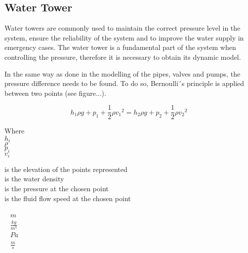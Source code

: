 \subsection{Water Tower} 
\label{WaterTankModel}

Water towers are commonly used to maintain the correct pressure level in the system, ensure the reliability of the system 
and to improve the water supply in emergency cases. The water tower is a fundamental part of the system when controlling the pressure, therefore it is 
necessary to obtain its dynamic model. 

In the same way as done in the modelling of the pipes, valves and pumps, the pressure difference needs to be found. 
To do so, Bernoulli´s principle is applied between two points (see figure...).

\begin{equation}
  \label{bernoulli}
  h_1\rho g + p_1 + \frac{1}{2}\rho {v_1}^2 = h_2\rho g + p_2 + \frac{1}{2}\rho {v_2}^2
\end{equation}

\begin{minipage}[t]{0.20\textwidth}
Where\\
\hspace*{8mm} $h_i$ \\
\hspace*{8mm} $\rho$ \\
\hspace*{8mm} $p_i$ \\
\hspace*{8mm} $v_i$ \\

\end{minipage}
\begin{minipage}[t]{0.68\textwidth}
\vspace*{2mm}
is the elevation of the points represented\\
is the water density\\
is the pressure at the chosen point\\
is the fluid flow speed at the chosen point
\end{minipage}
\begin{minipage}[t]{0.10\textwidth}
\vspace*{2mm}
\textcolor{White}{te}$\unit{m}$\\
\textcolor{White}{te}$\unit{\frac{kg}{m^3}}$\\
\textcolor{White}{te}$\unit{Pa}$\\
\textcolor{White}{te}$\unit{\frac{m}{s}}$
\end{minipage}

